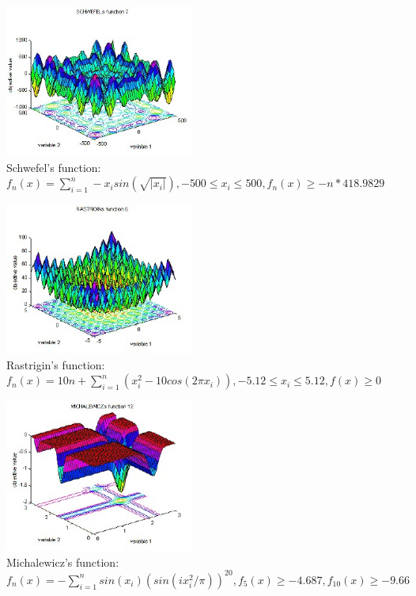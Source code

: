 \documentclass[12pt,leqno]{article}
\begin{document}
\vfill

\begin{figure}[bp!]
  \centering
  \includegraphics[width=0.4\linewidth, height=5cm]{schwefel.jpg}
  \caption*{Schwefel's function: $ f_n(x) = \sum_{i = 1}^{n}-x_i sin(\sqrt{|x_i|}) , -500 \leq x_i \leq 500 , f_n(x) \geq -n * 418.9829$}
\end{figure}
    
\newpage
\vfill

\begin{figure}[bp!]
  \centering
  \includegraphics[width=0.4\linewidth, height=5cm]{rastrigin.jpg} 
  \caption*{Rastrigin's function: $ f_n(x) = 10n + \sum_{i = 1}^{n}(x_i^2 - 10 cos(2 \pi x_i)), -5.12 \leq x_i \leq 5.12, f(x) \geq 0 $}
\end{figure}
    
\begin{figure}[bp!]
  \centering
  \includegraphics[width=0.4\linewidth, height=5cm]{michalenwicz.jpg}
  \caption*{Michalewicz's function: $ f_n(x) = -\sum_{i = 1}^{n} sin(x_i) (sin(i x_i^2 / \pi)) ^ 20, f_5(x) \geq -4.687, f_{10}(x) \geq -9.66$}  
\end{figure}
\end{document}
